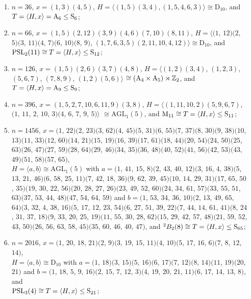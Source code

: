 \documentclass[12pt,reqno]{amsart}
\newcommand\A{\mathrm{A}} \newcommand\AGL{\mathrm{AGL}} \newcommand\AGammaL{\mathrm{A\Gamma L}} \newcommand\Alt{\mathrm{Alt}} \newcommand\ASL{\mathrm{ASL}} \newcommand\ASigmaL{\mathrm{A \Sigma L}} \newcommand\Aut{\mathrm{Aut}}
\newcommand\D{\mathrm{D}}   \def\det{{\sf det}}
\newcommand\M{\mathrm{M}} \newcommand{\magma}{{\sc Magma}} \renewcommand \mod{{\rm mod~}}
\numberwithin {equation} {section}
\begin{document}
\begin{enumerate}[\rm (i)]
 \item $n=36$, $x=(1,3)(4,5)$, $H=\langle (1,5)(3,4), (1,5,4,6,3)\rangle \cong \D_{10} $, and $T=\langle H,x\rangle=\A_6 \leq\Sy_6$;

 \item $n=66$, $x=(1,5)(2,12)(3,9)(4,6)(7,10)(8,11)$, $H=\langle (1$, $12)(2$, $5)(3$, $11)(4$, $7)(6$, $10)(8$, $9)$, $(1,7,6,3,5)(2,11,10,4,12)\rangle \cong \D_{10}$, and $\mathrm{PSL}_2(11)\cong T=\langle H,x\rangle \leq\mathrm{S}_{12}$;

 \item $n=126$,  $x=(1,5)(2,6)(3,7)(4,8)$,
 $H=\langle (1,2)(3,4)$, $(1,2,3)$, $(5,6,7)$, $(7,8,9)$, $(1,2)(5,6)\rangle$ $\cong(\A_4\times\A_5)\rtimes\ZZ_2$, and $T =\langle H,x\rangle=\A_9 \leq\Sy_9$;

 \item $n=396$, $x= (1,5,2,7,10,6,11,9)(3,8)$, $H=\langle (1,11,10,2)(5,9,6,7)$, $(1$, $11$, $2$, $10$, $3)(4$, $6$, $7$, $9$, $5)\rangle$ $\cong\AGL_1(5)$, and $\M_{11}\cong T =\langle H,x\rangle \leq \Sy_{11}$;

 \item $n=1456$, $x=(1$, $22)(2$, $23)(3$, $62)(4$, $45)(5$, $31)(6$, $55)(7$, $37)(8$, $30)(9$, $38)(10$, $13)(11$, $33)(12$, $60)(14$, $21)(15$, $19)(16$, $39)(17$, $61)(18$, $44)(20$, $54)(24$, $50)(25$, $63)(26$, $47)(27$, $59)(28$, $64)(29$, $46)(34$, $35)(36$, $48)(40$, $52)(41$, $56)(42$, $53)(43$, $49)(51$, $58)(57$, $65)$, \\ $H=\langle a,b\rangle\cong\AGL_1(5)$ with $a= (1$, $41$, $15$, $8)(2$, $43$, $40$, $12)(3$, $16$, $4$, $38)(5$, $13$, $21$, $46)(6$, $58$, $25$, $11)(7$,
        $42$, $18$, $36)(9$, $62$, $39$, $45)(10$, $14$, $29$, $31)(17$, $65$, $50$, $35)(19$, $30$, $22$, $56)(20$, $28$, $27$, $26)(23$, $49$, $52$, $60)(24$, $34$, $61$, $57)(33$, $55$, $51$, $63)(37$, $53$, $44$, $48)(47$, $54$, $64$, $59)$ and
$b=(1$, $53$, $34$, $36$, $10)(2$, $13$, $49$, $65$, $64)(3$, $32$, $4$, $38$, $16)(5$, $17$, $12$, $23$, $54)(6$, $27$, $51$, $39$, $22)(7$, $44$, $14$, $61$, $41)(8$, $24$, $31$, $37$, $18)(9$, $33$, $20$, $25$, $19)(11$, $55$, $30$, $28$, $62)(15$, $29$, $42$, $57$, $48)(21$, $59$, $52$, $43$, $50)(26$, $56$, $63$, $58$, $45)(35$, $60$, $46$, $40$, $47)$,
and ${}^2B_2(8)\cong T=\langle H,x\rangle\leq \mathrm{S}_{65}$;


\item $n=2016$, $x=(1$, $20$, $18$, $21)(2$, $9)(3$, $19$, $15$, $11)(4$, $10)(5$, $17$, $16$, $6)(7$, $8$, $12$, $14)$, \\ $H=\langle a,b\rangle\cong\D_{10}$ with $a=(1$, $18)(3$, $15)(5$, $16)(6$, $17)(7$, $12)(8$, $14)(11$, $19)(20$, $21)$ and $b=(1$, $18$, $5$, $9$, $16)(2$, $15$, $7$, $12$, $3)(4$, $19$, $20$, $21$, $11)(6$, $17$, $14$, $13$, $8)$, and \\
 $\mathrm{PSL}_3(4)\cong T=\langle H,x\rangle\leq\mathrm{S}_{21} $;


\end{enumerate}
\end{document}
